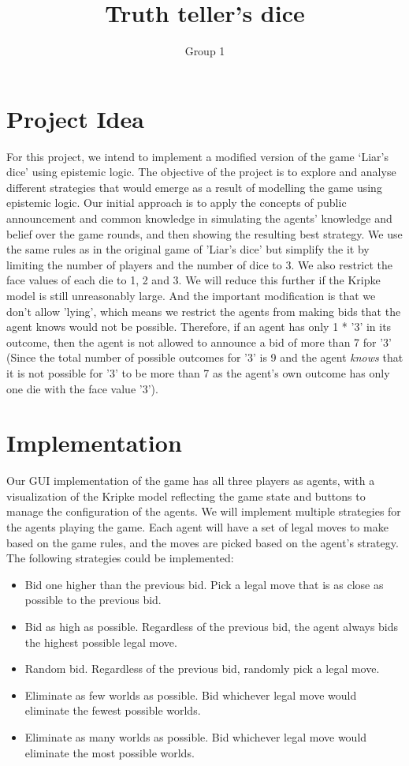 \documentclass{article}
\title{Truth teller's dice}
\author{Group 1}
\begin{document}
\maketitle

\section{Project Idea} %
For this project, we intend to implement a modified version of the game ‘Liar’s dice’ using epistemic logic. The objective of the project is to explore and analyse different strategies that would emerge as a result of modelling the game using epistemic logic. Our initial approach is to apply the concepts of public announcement and common knowledge in simulating the agents' knowledge and belief over the game rounds, and then showing the resulting best strategy. We use the same rules as in the original game of 'Liar's dice' but simplify the it by limiting the number of players and the number of dice to 3. We also restrict the face values of each die to 1, 2 and 3. We will reduce this further if the Kripke model is still unreasonably large. And the important modification is that we don't allow 'lying', which means we restrict the agents from making bids that the agent knows would not be possible. Therefore, if an agent has only 1 * '3' in its outcome, then the agent is not allowed to announce a bid of more than 7 for '3' (Since the total number of possible outcomes for '3' is 9 and the agent \textit{knows} that it is not possible for '3' to be more than 7 as the agent's own outcome has only one die with the face value '3').

\section{Implementation} %
Our GUI implementation of the game has all three players as agents, with a visualization of the Kripke model reflecting the game state and buttons to manage the configuration of the agents. We will implement multiple strategies for the agents playing the game. Each agent will have a set of legal moves to make based on the game rules, and the moves are picked based on the agent's strategy. The following strategies could be implemented:
\begin{itemize}
    \item Bid one higher than the previous bid. Pick a legal move that is as close as possible to the previous bid.
    \item Bid as high as possible. Regardless of the previous bid, the agent always bids the highest possible legal move.
    \item Random bid. Regardless of the previous bid, randomly pick a legal move.
    \item Eliminate as few worlds as possible. Bid whichever legal move would eliminate the fewest possible worlds.
    \item Eliminate as many worlds as possible. Bid whichever legal move would eliminate the most possible worlds.
\end{itemize}
\end{document}
